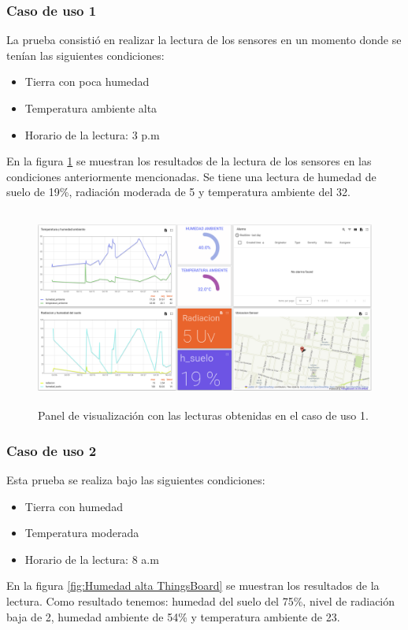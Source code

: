 \subsubsection{Caso de uso 1}
La prueba consistió en realizar la lectura de los sensores en un momento donde se tenían las siguientes condiciones:
\begin{itemize}
  \item Tierra con poca humedad
  \item Temperatura ambiente alta 
  \item Horario de la lectura: 3 p.m
\end{itemize}
En la figura \ref{fig:Lectura tierra seca tb} se muestran los resultados de la lectura de los sensores en las condiciones anteriormente mencionadas. Se tiene una lectura de humedad de suelo de 19\%, radiación moderada de 5 y temperatura ambiente del 32\textcelsius.

\begin{figure}[h!]
  \centering
    \includegraphics[width=\linewidth, height=6.5cm]{./Figures/tb_prueba1.png}
  \caption{Panel de visualización con las lecturas obtenidas en el caso de uso 1.}
    \label{fig:Lectura tierra seca tb}
\end{figure}

\subsubsection{Caso de uso 2}
Esta prueba se realiza bajo las siguientes condiciones:
\begin{itemize}
  \item Tierra con humedad
  \item Temperatura moderada
  \item Horario de la lectura: 8 a.m
\end{itemize}

En la figura \ref{fig:Humedad alta ThingsBoard} se muestran los resultados de la lectura. Como resultado tenemos: humedad del suelo del 75\%, nivel de radiación baja de 2, humedad ambiente de 54\% y temperatura ambiente de 23\textcelsius.

